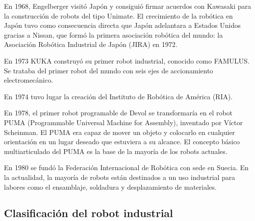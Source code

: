 \documentclass[12pt,a4paper]{report}
\begin{document}
En 1968, Engelberger visitó Japón y consiguió firmar acuerdos con Kawasaki para
la construcción de robots del tipo Unimate. El crecimiento de la robótica en
Japón tuvo como consecuencia directa que Japón adelantara a Estados Unidos
gracias a Nissan, que formó la primera asociación robótica del mundo: la
Asociación Robótica Industrial de Japón (JIRA) en 1972. 

En 1973 KUKA construyó su primer robot industrial, conocido como FAMULUS. Se
trataba del primer robot del mundo con seis ejes de accionamiento
electromecánico.

En 1974 tuvo lugar la creación del Instituto de
Robótica de América (RIA).

En 1978, el primer robot programable de Devol se transformaría en el robot PUMA
(Programmable Universal Machine for Assembly), inventado por Víctor Scheinman. El PUMA era capaz de mover un
objeto y colocarlo en cualquier orientación en un lugar deseado que estuviera a
su alcance. El concepto básico multiarticulado del PUMA es la base de la mayoría
de los robots actuales.

En 1980 se fundó la Federación Internacional de Robótica con sede en Suecia.
En la actualidad, la mayoría de robots están destinados a un uso industrial para
labores como el ensamblaje, soldadura y desplazamiento de materiales.

\subsection{Clasificación del robot industrial}
\end{document}
